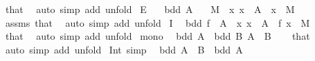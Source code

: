 \begin{isabellebody}
\isamarkupfalse%
\ that\ \isamarkupfalse%
\ {\isacharparenleft}{\kern0pt}auto\ simp\ add{\isacharcolon}{\kern0pt}\ unfold{\isacharparenright}{\kern0pt}%
\endisatagproof
{\isafoldproof}%
%
\isadelimproof
\isanewline
%
\endisadelimproof
\isanewline
{}\isamarkupfalse%
\ E{\isacharcolon}{\kern0pt}\isanewline
\ \ \ {\isacartoucheopen}bdd\ A{\isacartoucheclose}\isanewline
\ \ \ M\ \ {\isacartoucheopen}{\isasymAnd}x{\isachardot}{\kern0pt}\ x\ {\isasymin}\ A\ {\isasymLongrightarrow}\ x\ \isactrlbold {\isasymle}\ M{\isacartoucheclose}\isanewline
%
\isadelimproof
\ \ %
\endisadelimproof
%
\isatagproof
{}\isamarkupfalse%
\ assms\ that\ \isamarkupfalse%
\ {\isacharparenleft}{\kern0pt}auto\ simp\ add{\isacharcolon}{\kern0pt}\ unfold{\isacharparenright}{\kern0pt}%
\endisatagproof
{\isafoldproof}%
%
\isadelimproof
\isanewline
%
\endisadelimproof
\isanewline
{}\isamarkupfalse%
\ I{}{\isacharcolon}{\kern0pt}\isanewline
\ \ {\isacartoucheopen}bdd\ {\isacharparenleft}{\kern0pt}f\ {\isacharbackquote}{\kern0pt}\ A{\isacharparenright}{\kern0pt}{\isacartoucheclose}\ \ {\isacartoucheopen}{\isasymAnd}x{\isachardot}{\kern0pt}\ x\ {\isasymin}\ A\ {\isasymLongrightarrow}\ f\ x\ \isactrlbold {\isasymle}\ M{\isacartoucheclose}\isanewline
%
\isadelimproof
\ \ %
\endisadelimproof
%
\isatagproof
{}\isamarkupfalse%
\ that\ \isamarkupfalse%
\ {\isacharparenleft}{\kern0pt}auto\ simp\ add{\isacharcolon}{\kern0pt}\ unfold{\isacharparenright}{\kern0pt}%
\endisatagproof
{\isafoldproof}%
%
\isadelimproof
\isanewline
%
\endisadelimproof
\isanewline
{}\isamarkupfalse%
\ mono{\isacharcolon}{\kern0pt}\isanewline
\ \ {\isacartoucheopen}bdd\ A{\isacartoucheclose}\ \ {\isacartoucheopen}bdd\ B{\isacartoucheclose}\ {\isacartoucheopen}A\ {\isasymsubseteq}\ B{\isacartoucheclose}\isanewline
%
\isadelimproof
\ \ %
\endisadelimproof
%
\isatagproof
{}\isamarkupfalse%
\ that\ \isamarkupfalse%
\ {\isacharparenleft}{\kern0pt}auto\ simp\ add{\isacharcolon}{\kern0pt}\ unfold{\isacharparenright}{\kern0pt}%
\endisatagproof
{\isafoldproof}%
%
\isadelimproof
\isanewline
%
\endisadelimproof
\isanewline
{}\isamarkupfalse%
\ Int{}\ {\isacharbrackleft}{\kern0pt}simp{\isacharbrackright}{\kern0pt}{\isacharcolon}{\kern0pt}\isanewline
\ \ {\isacartoucheopen}bdd\ {\isacharparenleft}{\kern0pt}A\ {\isasyminter}\ B{\isacharparenright}{\kern0pt}{\isacartoucheclose}\ \ {\isacartoucheopen}bdd\ A{\isacartoucheclose}\isanewline

\end{isabellebody}
